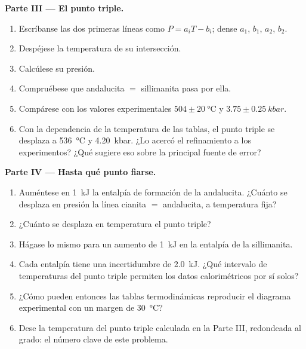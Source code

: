 \begin{problem}
\noindent\textbf{Parte III --- El punto triple.}
\begin{enumerate}[resume]
\item Escríbanse las dos primeras líneas como $P = a_i T - b_i$; dense $a_1$, $b_1$, $a_2$, $b_2$.
\item Despéjese la temperatura de su intersección.
\item Calcúlese su presión.
\item Compruébese que andalucita $=$ sillimanita pasa por ella.
\item Compárese con los valores experimentales $504 \pm \qty{20}{\celsius}$ y $3.75 \pm
\qty{0.25}{kbar}$.
\item Con la dependencia de la temperatura de las tablas, el punto triple se desplaza a
\qty{536}{\celsius} y \qty{4.20}{kbar}. ¿Lo acercó el refinamiento a los
experimentos? ¿Qué sugiere eso sobre la principal fuente de error?
\end{enumerate}

\noindent\textbf{Parte IV --- Hasta qué punto fiarse.}
\begin{enumerate}[resume]
\item Auméntese en \qty{1}{kJ} la entalpía de formación de la andalucita. ¿Cuánto se desplaza
en presión la línea cianita $=$ andalucita, a temperatura fija?
\item ¿Cuánto se desplaza en temperatura el punto triple?
\item Hágase lo mismo para un aumento de \qty{1}{kJ} en la entalpía de la sillimanita.
\item Cada entalpía tiene una incertidumbre de \qty{2.0}{kJ}. ¿Qué intervalo de temperaturas del punto
triple permiten los datos calorimétricos por sí solos?
\item ¿Cómo pueden entonces las tablas termodinámicas reproducir el diagrama experimental con un margen de
\qty{30}{\celsius}?
\item Dese la temperatura del punto triple calculada en la Parte III, redondeada al
grado: el número clave de este problema.
\end{enumerate}
\end{problem}
